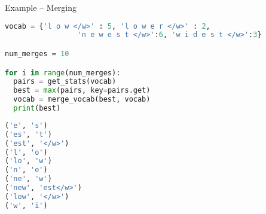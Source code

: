 \begin{vbframe}{Example -- Merging \href{https://www.aclweb.org/anthology/P16-1162.pdf}{}}

\vspace{-.5cm}

\begin{lstlisting}[language=Python]
vocab = {'l o w </w>' : 5, 'l o w e r </w>' : 2, 
				 'n e w e s t </w>':6, 'w i d e s t </w>':3}

num_merges = 10

for i in range(num_merges):
  pairs = get_stats(vocab)
  best = max(pairs, key=pairs.get)
  vocab = merge_vocab(best, vocab)
  print(best)
\end{lstlisting}

\vspace{-.5cm}

\begin{lstlisting}[language=Python]
('e', 's')
('es', 't')
('est', '</w>')
('l', 'o')
('lo', 'w')
('n', 'e')
('ne', 'w')
('new', 'est</w>')
('low', '</w>')
('w', 'i')
\end{lstlisting}

\end{vbframe}


\endlecture

